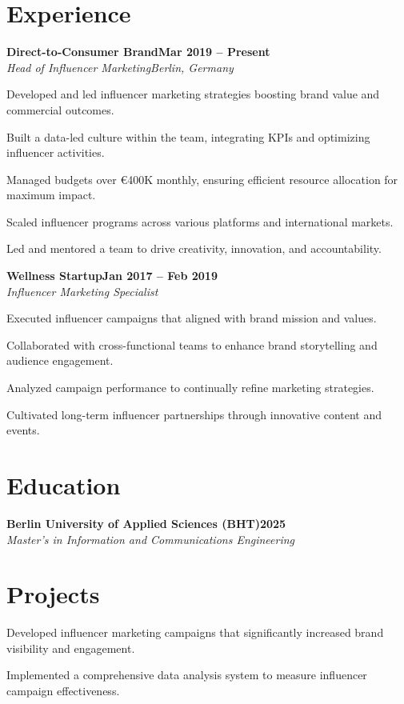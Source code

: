 \documentclass[letterpaper,10pt]{article}
\newcommand{\heading}[2]{
  \hspace{10pt}#1\hfill#2\\
}
\newcommand{\headingBf}[2]{
  \heading{\textbf{#1}}{\textbf{#2}}
}
\newcommand{\headingIt}[2]{
  \heading{\textit{#1}}{\textit{#2}}
}
\newenvironment{resume_list}{
  \vspace{-7pt}
  \begin{itemize}[itemsep=-2px, parsep=1pt, leftmargin=20pt, labelsep=10pt]
}{
  \end{itemize}
}
\begin{document}
\section{Experience}
\headingBf{Direct-to-Consumer Brand}{Mar 2019 -- Present}
\headingIt{Head of Influencer Marketing}{Berlin, Germany}
\begin{resume_list}
  \item Developed and led influencer marketing strategies boosting brand value and commercial outcomes.
  \item Built a data-led culture within the team, integrating KPIs and optimizing influencer activities.
  \item Managed budgets over €400K monthly, ensuring efficient resource allocation for maximum impact.
  \item Scaled influencer programs across various platforms and international markets.
  \item Led and mentored a team to drive creativity, innovation, and accountability.
\end{resume_list}

\headingBf{Wellness Startup}{Jan 2017 -- Feb 2019}
\headingIt{Influencer Marketing Specialist}{}
\begin{resume_list}
  \item Executed influencer campaigns that aligned with brand mission and values.
  \item Collaborated with cross-functional teams to enhance brand storytelling and audience engagement.
  \item Analyzed campaign performance to continually refine marketing strategies.
  \item Cultivated long-term influencer partnerships through innovative content and events.
\end{resume_list}

\section{Education}
\headingBf{Berlin University of Applied Sciences (BHT)}{2025}
\headingIt{Master's in Information and Communications Engineering}{}

\section{Projects}
\begin{resume_list}
  \item Developed influencer marketing campaigns that significantly increased brand visibility and engagement.
  \item Implemented a comprehensive data analysis system to measure influencer campaign effectiveness.
\end{resume_list}
\end{document}
